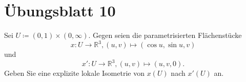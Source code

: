 %
\section{Übungsblatt 10}
\setcounter{problemcounter}{0}

\begin{assignment}
  Sei \( U \coloneqq (0,1) \times (0, \infty) \). Gegen seien die parametrisierten Flächenstücke
  \begin{equation*}
    x : U \to \mathbb{R}^3, (u,v) \mapsto (\cos u, \sin u, v)
  \end{equation*} 
  und 
  \begin{equation*}
    x' : U \to \mathbb{R}^3, (u,v) \mapsto (u,v,0).
  \end{equation*}
  Geben Sie eine explizite lokale Isometrie von \( x(U) \) nach \( x'(U) \) an.
\end{assignment}
